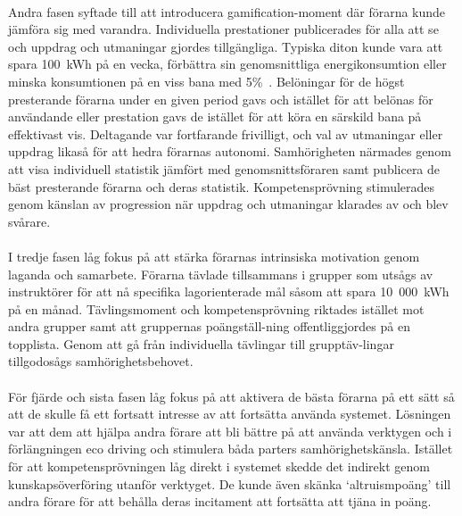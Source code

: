 \paragraph{}
\hspace{-11pt}Andra fasen syftade till att introducera gamification-moment där förarna kunde jämföra sig med varandra.
Individuella prestationer publicerades för alla att se och uppdrag och utmaningar gjordes tillgängliga.
Typiska diton kunde vara att spara 100~kWh på en vecka, förbättra sin genomsnittliga energikonsumtion eller minska konsumtionen på en viss bana med 5\%~\cite{Cwil2018}.
Belöningar för de högst presterande förarna under en given period gavs och istället för att belönas för användande eller prestation gavs de istället för att köra en särskild bana på effektivast vis.
Deltagande var fortfarande frivilligt, och val av utmaningar eller uppdrag likaså för att hedra förarnas autonomi.
Samhörigheten närmades genom att visa individuell statistik jämfört med genomsnittsföraren samt publicera de bäst presterande förarna och deras statistik.
Kompetensprövning stimulerades genom känslan av progression när uppdrag och utmaningar klarades av och blev svårare.
\paragraph{}
\hspace{-11pt}I tredje fasen låg fokus på att stärka förarnas intrinsiska motivation genom laganda och samarbete.
Förarna tävlade tillsammans i grupper som utsågs av instruktörer för att nå specifika lagorienterade mål såsom att spara 10~000~kWh på en månad.
Tävlingsmoment och kompetensprövning riktades istället mot andra grupper samt att gruppernas poängställ-ning offentliggjordes på en topplista.
Genom att gå från individuella tävlingar till grupptäv-lingar tillgodosågs samhörighetsbehovet.
\paragraph{}
\hspace{-11pt}För fjärde och sista fasen låg fokus på att aktivera de bästa förarna på ett sätt så att de skulle få ett fortsatt intresse av att fortsätta använda systemet.
Lösningen var att dem att hjälpa andra förare att bli bättre på att använda verktygen och i förlängningen eco driving och stimulera båda parters samhörighetskänsla.
Istället för att kompetensprövningen låg direkt i systemet skedde det indirekt genom kunskapsöverföring utanför verktyget.
De kunde även skänka \lq{}altruismpoäng\rq{} till andra förare för att behålla deras incitament att fortsätta att tjäna in poäng.
